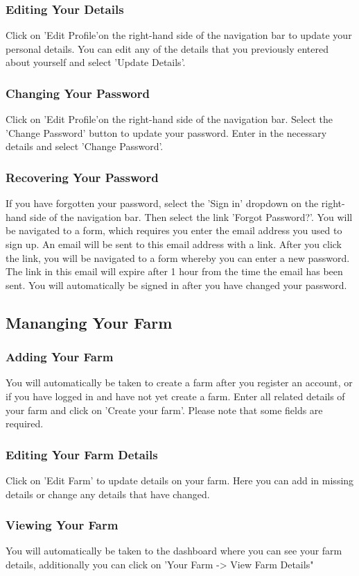 \documentclass[11pt,fleqn]{book} %
\begin{document}
			\subsubsection{Editing Your Details}
				Click on 'Edit Profile'on the right-hand side of the navigation bar to update your personal details. You can edit any of the details that you previously entered about yourself and select 'Update Details'.
			\subsubsection{Changing Your Password}
				Click on 'Edit Profile'on the right-hand side of the navigation bar. Select the 'Change Password' button to update your password. Enter in the necessary details and select 'Change Password'.
			\subsubsection{Recovering Your Password}
				If you have forgotten your password, select the 'Sign in' dropdown on the right-hand side of the navigation bar. Then select the link 'Forgot Password?'. You will be navigated to a form, which requires you enter the email address you used to sign up. An email will be sent to this email address with a link. After you click the link, you will be navigated to a form whereby you can enter a new password. The link in this email will expire after 1 hour from the time the email has been sent. You will automatically be signed in after you have changed your password.		
		\subsection{Mananging Your Farm}
			\subsubsection{Adding Your Farm}
			 You will automatically be taken to create a farm after you register an account, or if you have logged in and have not yet create a farm. Enter all related details of your farm and click on 'Create your farm'. Please note that some fields are required.
			\subsubsection{Editing Your Farm Details}
			Click on 'Edit Farm' to update details on your farm. Here you can add in missing details or change any details that have changed.
			\subsubsection{Viewing Your Farm}
			You will automatically be taken to the dashboard where you can see your farm details, additionally you can click on 'Your Farm -> View Farm Details"
			
\end{document}
